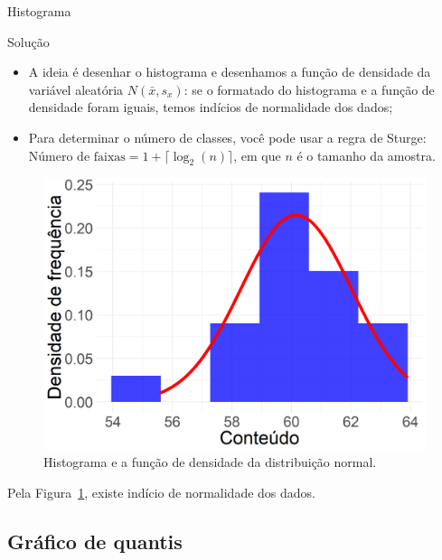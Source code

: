\documentclass[10pt]{beamer}
\begin{document}
\begin{frame}{Histograma}

\footnotesize
\begin{block}{Solução}

\begin{itemize}
	\item A ideia é desenhar o histograma e desenhamos a função de densidade da variável aleatória $N(\bar{x}, s_x)$: se o formatado do histograma e a função de densidade foram iguais, temos indícios de normalidade dos dados;
	\item Para determinar o número de classes, você pode usar a regra de Sturge: $\mbox{Número de faixas} = 1 + \lceil \log_2(n) \rceil$, em que $n$ é o tamanho da amostra.
\end{itemize}


\begin{figure}[htbp]
	\centering
	\caption{Histograma e a função de densidade da distribuição normal.}
	\label{fig:conteudo}
	\includegraphics[width=0.35\linewidth]{figures/conteudo.png}
\end{figure}

Pela Figura~\ref{fig:conteudo}, existe indício de normalidade dos dados.

\end{block}
\normalsize

\end{frame}

\subsection{Gráfico de quantis}
\end{document}
